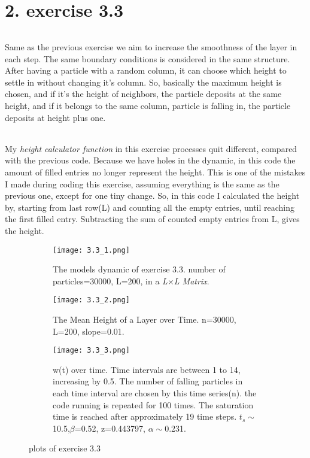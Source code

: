 \documentclass[12pt]{article}
\begin{document}
\part*{2. exercise 3.3}
\paragraph*{} Same as the previous exercise we aim to increase the smoothness of the layer in each step. The same boundary conditions is considered in the same structure. After having a particle with a random column, it can choose which height to settle in without changing it's column. So, basically the maximum height is chosen, and if it's the height of neighbors, the particle deposits at the same height, and if it belongs to the same column, particle is falling in, the particle deposits at height plus one. 
\paragraph*{} My \textit{ height calculator function} in this exercise processes quit different, compared with the previous code. Because we have holes in the dynamic, in this code the amount of filled entries no longer represent the height. This is one of the mistakes I made during coding this exercise, assuming everything is the same as the previous one, except for one tiny change. So, in this code I calculated the height by, starting from last row(L) and counting all the empty entries, until reaching the first filled entry. Subtracting the sum of counted empty entries from L, gives the height. 
\begin{figure}[H]
	\centering
	\begin{subfigure}[normal]{0.8\textwidth}
		\texttt{[image: 3.3\_1.png]}
		\caption{The models dynamic of exercise 3.3. number of particles=30000, L=200, in a \textit{L$\times$L Matrix}.}
		\label{fig:mesh2.1}
	\end{subfigure}
	\begin{subfigure}[t]{0.45\textwidth}
		\texttt{[image: 3.3\_2.png]}
		\label{fig:mesh2.2}
		\caption{The Mean Height of a Layer over Time. n=30000, L=200, slope=0.01.}
		
	\end{subfigure}\hfill
	\begin{subfigure}[t]{0.45\textwidth}
		\texttt{[image: 3.3\_3.png]}
		\label{fig:mesh2.3}
		\caption{w(t) over time. Time intervals are between 1 to 14, increasing by 0.5. The number of falling particles in each time interval are chosen by this time series(n). the code running is repeated for 100 times. The saturation time is reached after approximately 19 time steps. $t_{s}\sim$ 10.5,$\beta$=0.52, z=0.443797, $\alpha\sim $0.231.}
		\end{subfigure}
	\label{fig:mesh2}
	\caption{plots of exercise 3.3}
\end{figure}
\pagebreak
\end{document}
